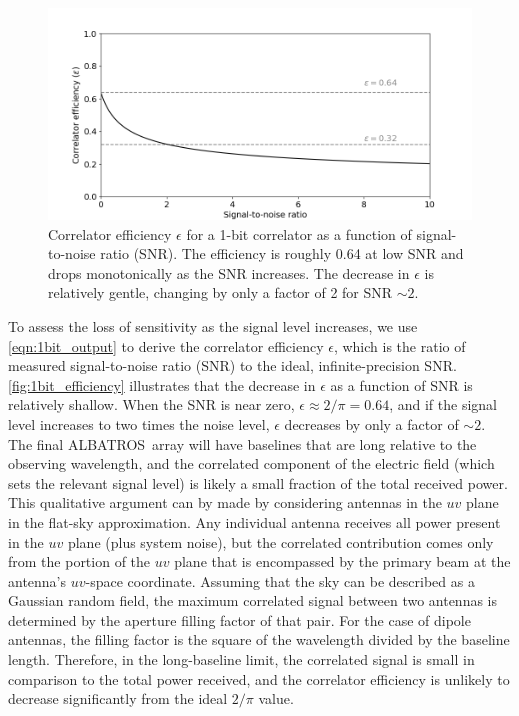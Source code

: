 \documentclass{ws-jai}
\def\albatros{ALBATROS}
\begin{document}
\begin{figure}
  \begin{center}
    \includegraphics[width=0.7\linewidth]{Figures/corr_efficiency/corr_efficiency.png}
    \caption{Correlator efficiency $\epsilon$ for a 1-bit correlator
      as a function of signal-to-noise ratio (SNR).  The efficiency is
      roughly 0.64 at low SNR and drops monotonically as the SNR
      increases.  The decrease in $\epsilon$ is relatively gentle,
      changing by only a factor of 2 for SNR $\sim2$.}
    \label{fig:1bit_efficiency}
    \end{center}
\end{figure}


To assess the loss of sensitivity as the signal level increases, we
use \autoref{eqn:1bit_output} to derive the correlator efficiency
$\epsilon$, which is the ratio of measured signal-to-noise ratio (SNR)
to the ideal, infinite-precision SNR.  \autoref{fig:1bit_efficiency}
illustrates that the decrease in $\epsilon$ as a function of SNR is
relatively shallow.  When the SNR is near zero, $\epsilon \approx
2/\pi = 0.64$, and if the signal level increases to two times the
noise level, $\epsilon$ decreases by only a factor of $\sim2$.  The
final \albatros\ array will have baselines that are long relative to
the observing wavelength, and the correlated component of the electric
field (which sets the relevant signal level) is likely a small
fraction of the total received power.  This qualitative argument can
by made by considering antennas in the $uv$ plane in the flat-sky
approximation.  Any individual antenna receives all power present in
the $uv$ plane (plus system noise), but the correlated contribution
comes only from the portion of the $uv$ plane that is encompassed by
the primary beam at the antenna's $uv$-space coordinate.  Assuming
that the sky can be described as a Gaussian random field, the maximum
correlated signal between two antennas is determined by the aperture
filling factor of that pair.  For the case of dipole antennas, the
filling factor is the square of the wavelength divided by the baseline
length.  Therefore, in the long-baseline limit, the correlated signal
is small in comparison to the total power received, and the correlator
efficiency is unlikely to decrease significantly from the ideal
$2/\pi$ value.
\end{document}

